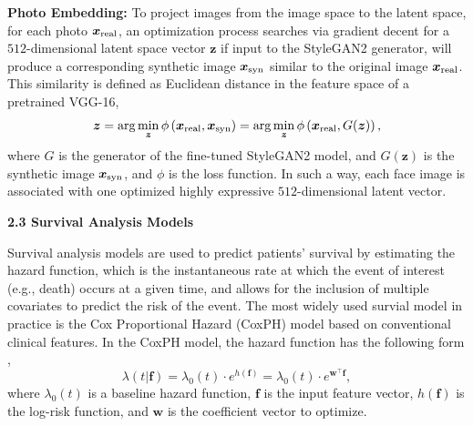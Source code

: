 \documentclass[runningheads]{llncs}
\newcommand{\xreal}{\boldsymbol{x}\textsubscript{real}}
\newcommand{\xfake}{\boldsymbol{x}\textsubscript{syn}}
\newcommand{\vz}{\boldsymbol{z}}
\newcommand{\vf}{\boldsymbol{f}}
\newcommand{\vw}{\boldsymbol{w}}
\begin{document}
\noindent\textbf{Photo Embedding:} To project images from the image space to
the latent space, for each photo $\xreal$, an optimization process searches via gradient decent for a $512$-dimensional latent space vector $\vz$ if input to the StyleGAN2 generator, will produce a corresponding synthetic image $\xfake$ similar to the original image $\xreal$. This similarity is defined as Euclidean distance in the feature space of a pretrained VGG-16,
\begin{equation}
\vz = \arg \min_{\vz} \phi\left(\xreal, \xfake \right) = \arg \min_{\vz} \phi\left(\xreal, G(\vz) \right) ,
\end{equation}
where $G$ is the generator of the fine-tuned StyleGAN2 model, and $G(\vz)$ is the synthetic image $\xfake$, and $\phi$ is the loss function. 
In such a way, each face image is associated with one optimized highly expressive $512$-dimensional latent vector.

\vspace{5pt}
\noindent\textbf{2.3 Survival Analysis Models}
\vspace{5pt}

Survival analysis models are used to predict patients' survival by estimating the hazard function, which is the instantaneous rate at which the event of interest (e.g., death) occurs at a given time, and allows for the inclusion of multiple covariates to predict the risk of the event. 
The most widely used survial model in practice is the Cox Proportional Hazard (CoxPH) \cite{lin2002modeling} model based on conventional clinical features.
In the CoxPH model, the hazard function has the following form \cite{katzman2018deepsurv},
\begin{equation}
\lambda(t|\vf)=\lambda_0(t)\cdot e^{h(\vf)}=\lambda_0(t)\cdot e^{\vw^\top\vf},
\end{equation}
where $\lambda_0(t)$ is a baseline hazard function, $\vf$ is the input feature vector, $h(\vf)$ is the log-risk function, and $\vw$ is the coefficient vector to optimize. 
\end{document}
